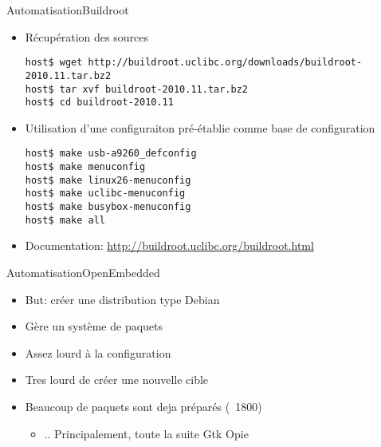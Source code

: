 \begin{frame}[fragile=singleslide]{Automatisation}{Buildroot}
  \begin{itemize}
  \item Récupération des sources
    \begin{lstlisting}
host$ wget http://buildroot.uclibc.org/downloads/buildroot-2010.11.tar.bz2
host$ tar xvf buildroot-2010.11.tar.bz2
host$ cd buildroot-2010.11
    \end{lstlisting} 
  \item  Utilisation  d'une configuraiton  pré-établie  comme base  de
    configuration
    \begin{lstlisting}
host$ make usb-a9260_defconfig
host$ make menuconfig
host$ make linux26-menuconfig
host$ make uclibc-menuconfig
host$ make busybox-menuconfig
host$ make all
    \end{lstlisting}
  \item Documentation: \url{http://buildroot.uclibc.org/buildroot.html}
  \end{itemize}
\end{frame}

\begin{frame}[fragile=singleslide]{Automatisation}{OpenEmbedded}
  \begin{itemize}
  \item But: créer une distribution type Debian
  \item Gère un système de paquets
  \item Assez lourd à la configuration
  \item Tres lourd de créer une nouvelle cible
  \item Beaucoup de paquets sont deja préparés (~1800)
    \begin{itemize}
    \item .. Principalement, toute la suite Gtk Opie
    \end{itemize}

  \end{itemize}
\end{frame}

